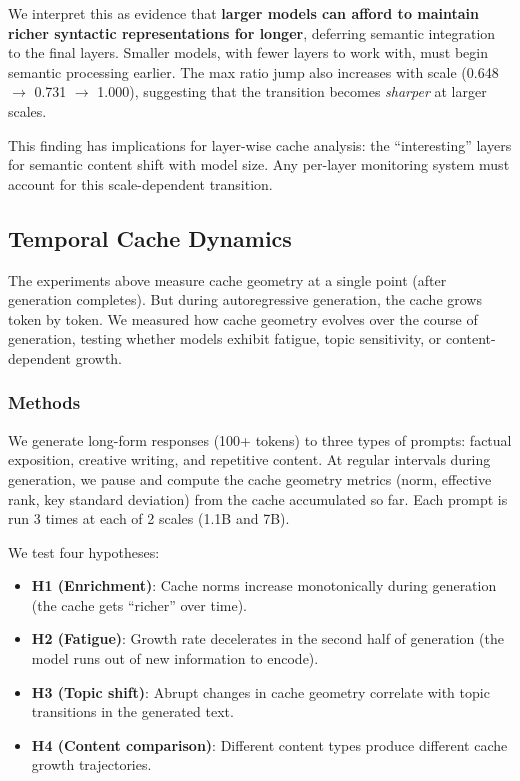 \documentclass[11pt,a4paper]{article}
\begin{document}
We interpret this as evidence that \textbf{larger models can afford to maintain richer syntactic representations for longer}, deferring semantic integration to the final layers. Smaller models, with fewer layers to work with, must begin semantic processing earlier. The max ratio jump also increases with scale (0.648 $\to$ 0.731 $\to$ 1.000), suggesting that the transition becomes \emph{sharper} at larger scales.

This finding has implications for layer-wise cache analysis: the ``interesting'' layers for semantic content shift with model size. Any per-layer monitoring system must account for this scale-dependent transition.

\subsection{Temporal Cache Dynamics}
\label{sec:temporal}

The experiments above measure cache geometry at a single point (after generation completes). But during autoregressive generation, the cache grows token by token. We measured how cache geometry evolves over the course of generation, testing whether models exhibit fatigue, topic sensitivity, or content-dependent growth.

\subsubsection{Methods}

We generate long-form responses (100+ tokens) to three types of prompts: factual exposition, creative writing, and repetitive content. At regular intervals during generation, we pause and compute the cache geometry metrics (norm, effective rank, key standard deviation) from the cache accumulated so far. Each prompt is run 3 times at each of 2 scales (1.1B and 7B).

We test four hypotheses:
\begin{itemize}[leftmargin=*]
    \item \textbf{H1 (Enrichment)}: Cache norms increase monotonically during generation (the cache gets ``richer'' over time).
    \item \textbf{H2 (Fatigue)}: Growth rate decelerates in the second half of generation (the model runs out of new information to encode).
    \item \textbf{H3 (Topic shift)}: Abrupt changes in cache geometry correlate with topic transitions in the generated text.
    \item \textbf{H4 (Content comparison)}: Different content types produce different cache growth trajectories.
\end{itemize}
\end{document}
